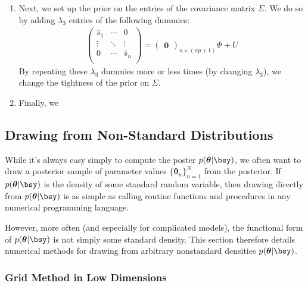 \documentclass[12pt]{article}
\theoremstyle{plain}
\theoremstyle{definition}
\theoremstyle{remark}
\newcommand{\bstheta}{\boldsymbol{\theta}}
\newcommand{\nN}{_{n=1}^N}
\begin{document}
\begin{enumerate}
    \item Next, we set up the prior on the entries of the
	covariance matrix $\Sigma$. We do so by adding
	$\lambda_3$ entries of the following dummies:
	\begin{align*}
	    \begin{pmatrix}
		\hat{s}_1 &  \cdots & 0 \\
		\vdots & \ddots & \vdots \\
		0 & \cdots & \hat{s}_n \\
	    \end{pmatrix} = \begin{pmatrix}\mathbf{0}
		\end{pmatrix}_{n \times (np+1)} \Phi + U
	\end{align*}
	By repeating these $\lambda_3$ dummies more or less
	times (by changing $\lambda_3$), we change the tightness
	of the prior on $\Sigma$.

    \item Finally, we

\end{enumerate}



\clearpage
\subsection{Drawing from Non-Standard Distributions}

While it's always easy simply to compute the poster $p(\bstheta|\bsy)$,
we often want to draw a posterior sample of parameter values
$\{\bstheta_n\}\nN$ from the posterior.
If $p(\bstheta|\bsy)$ is the density of some standard random variable,
then drawing directly from $p(\bstheta|\bsy)$ is as simple as calling
routine functions and procedures in any numerical programming language.

However, more often (and especially for complicated models), the
functional form of $p(\bstheta|\bsy)$ is not simply some standard
density. This section therefore details numerical methods for drawing
from arbitrary nonstandard densities $p(\bstheta|\bsy)$.

\subsubsection{Grid Method in Low Dimensions}
\end{document}
